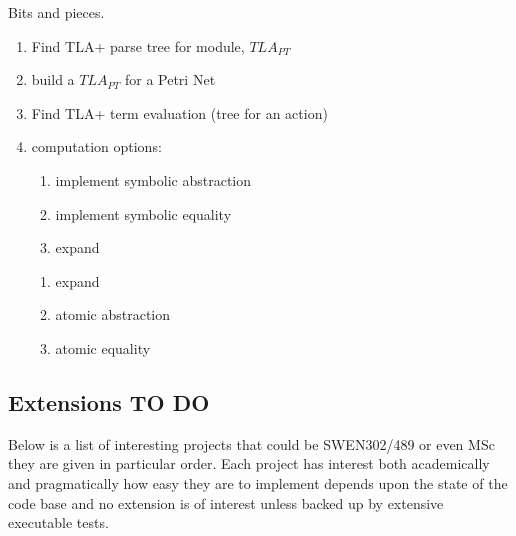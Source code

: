 \documentclass[]{article}
\begin{document}
Bits and pieces.

  \begin{enumerate}
  \item Find TLA+ parse tree for module, $TLA_{PT}$
  \item build  a $TLA_{PT}$ for a Petri Net
  \item Find TLA+ term evaluation (tree for an action)

 \item computation options:

\noindent\begin{center}\begin{minipage}{0.45\textwidth}
\begin{enumerate}
 \item implement  symbolic abstraction
 \item implement symbolic equality
 \item expand
 \end{enumerate}
 \end{minipage}
  \begin{minipage}{0.45\textwidth}
 \begin{enumerate}
  \item expand
  \item atomic abstraction
  \item atomic  equality
  \end{enumerate}
 \end{minipage}\end{center}
 \end{enumerate}



\subsection{Extensions TO DO}
Below is a list of interesting projects  that could be SWEN302/489  or even MSc they are given in particular order. Each project has interest both academically and pragmatically how easy they are to  implement depends upon the state of the code base and no extension is of interest unless backed up by extensive executable tests.
\end{document}
